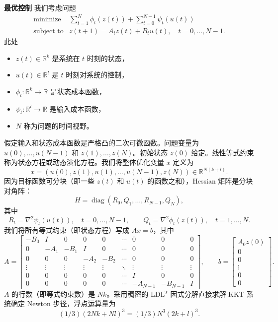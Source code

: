 \documentclass[UTF8, 12pt, fontset=fandol, oneside]{ctexart}
\begin{document}
\noindent\textbf{最优控制}\quad
我们考虑问题
\[
\begin{array}{ll}
\mbox{minimize} & \displaystyle\sum_{t=1}^N\phi_t(z(t))+\sum_{t=0}^{N-1}\psi_t(u(t))\\
\mbox{subject to} & z(t+1)=A_tz(t)+B_tu(t),\quad t=0,\ldots,N-1.
\end{array}
\]
此处

\begin{itemize}
\item $z(t)\in\mathbb{R}^k$ 是系统在 $t$ 时刻的状态，
\item $u(t)\in\mathbb{R}^l$ 是 $t$ 时刻对系统的控制，
\item $\phi_t:\mathbb{R}^k\to\mathbb{R}$ 是状态成本函数，
\item $\psi_t:\mathbb{R}^l\to\mathbb{R}$ 是输入成本函数，
\item $N$ 称为问题的时间视野。
\end{itemize}

假定输入和状态成本函数是严格凸的二次可微函数。问题变量为 $u(0),\ldots,u(N-1)$ 和 $z(1),\ldots,z(N)$。初始状态 $z(0)$ 给定。线性等式约束称为状态方程或动态演化方程。我们将整体优化变量 $x$ 定义为
\[
x=(u(0),z(1),u(1),\ldots,u(N-1),z(N))\in\mathbb{R}^{N(k+l)}.
\]
因为目标函数可分块（即一些 $z(t)$ 和 $u(t)$ 的函数之和），Hessian 矩阵是分块对角阵：
\[
H=\operatorname{diag}(R_0,Q_1,\ldots,R_{N-1},Q_N),
\]
其中
\[
R_t=\nabla^2\psi_t(u(t)),\quad t=0,\ldots,N-1,\qquad
Q_t=\nabla^2\phi_t(z(t)),\quad t=1,\ldots,N.
\]
我们将所有等式约束（即状态方程）写成 $Ax=b$，其中
\[
A=
\begin{bmatrix}
-B_0&I&0&0&0&\cdots&0&0&0\\
0&-A_1&-B_1&I&0&\cdots&0&0&0\\
0&0&0&-A_2&-B_2&\cdots&0&0&0\\
\vdots&\vdots&\vdots&\vdots&\vdots&\ddots&\vdots&\vdots&\vdots\\
0&0&0&0&0&\cdots&I&0&0\\
0&0&0&0&0&\cdots&-A_{N-1}&-B_{N-1}&I
\end{bmatrix},
\qquad
b=
\begin{bmatrix}
A_0z(0)\\
0\\
0\\
\vdots\\
0\\
0
\end{bmatrix}.
\]
$A$ 的行数（即等式约束数）是 $Nk$。采用稠密的 LDL$^T$ 因式分解直接求解 KKT 系统确定 Newton 步径，浮点运算量为
\[
(1/3)(2Nk+Nl)^3=(1/3)N^3(2k+l)^3.
\]
\end{document}
